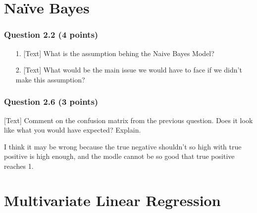 \documentclass[12pt]{article}
\begin{document}
\clearpage
{}
% 


\section*{Na\"ive Bayes}
\subsubsection*{Question 2.2 (4 points)}
\begin{enumerate}
    \item [1.] [Text] What is the assumption behing the Naive Bayes Model?
    \item [2.] [Text] What would be the main issue we would have to face if we didn't make this assumption?
\end{enumerate}




\subsubsection*{Question 2.6 (3 points)}
[Text] Comment on the confusion matrix from the previous question. Does it look like what you would have expected? Explain.





I think it may be wrong because the true negative shouldn't so high with true positive is high enough, and the modle cannot be so good that true positive reaches 1.




% 


\section*{Multivariate Linear Regression}
\end{document}
